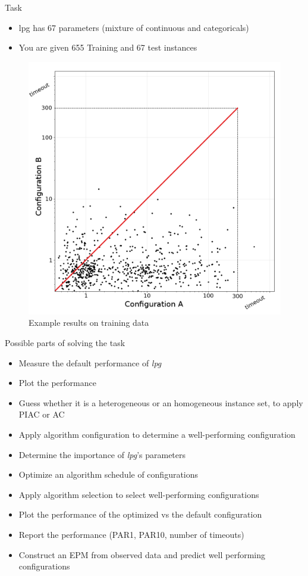 \begin{frame}[c]{Task}
\begin{itemize}
    \item lpg has 67 parameters (mixture of continuous and categoricals)
    \item You are given 655 Training and 67 test instances
\end{itemize}
\begin{figure}
    \centering
    \includegraphics[width=.5\textwidth]{exercises/scattertrain}
    \caption{Example results on training data}
\end{figure}
\end{frame}
\begin{frame}[c]{Possible parts of solving the task}
\begin{itemize}
    \item Measure the default performance of \textit{lpg}
    \pause
    \item Plot the performance
    \pause
    \item Guess whether it is a heterogeneous or an homogeneous instance set, to apply PIAC or AC
    \pause
    \item Apply algorithm configuration to determine a well-performing configuration
    \pause
    \item Determine the importance of \textit{lpg}'s parameters
    \pause
    \item Optimize an algorithm schedule of configurations
    \pause
    \item Apply algorithm selection to select well-performing configurations
    \pause 
    \item Plot the performance of the optimized vs the default configuration
    \pause
    \item Report the performance (PAR1, PAR10, number of timeouts)
    \pause
    \item Construct an EPM from observed data and predict well performing configurations
\end{itemize}
\end{frame}
